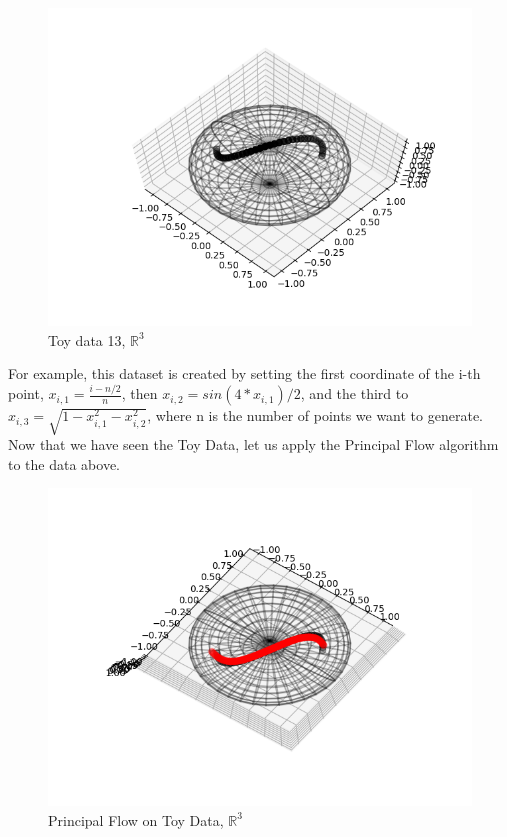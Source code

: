 \documentclass[12pt]{report}
\begin{document}
\begin{figure}[h]
    \begin{center}
        \includegraphics[]{Data_13.png}
        \caption{Toy data 13, $\mathbb{R}^3$}
        \label{fig:toydata}
    \end{center}
\end{figure}

\newpage

For example, this dataset is created by setting the first coordinate of the 
i-th point, $x_{i, 1} = \frac{i-n/2}{n}$, then $x_{i, 2} = sin(4*x_{i, 1})/2$, 
and the third to $x_{i, 3} = \sqrt{1-x_{i, 1}^2 - x_{i, 2}^2}$, 
where n is the number of points we want to generate.\\
Now that we have seen the Toy Data, let us apply the Principal Flow 
algorithm to the data above.

\begin{figure}[h]
    \begin{center}
        \includegraphics[]{single_flow_13.png}
        \caption{Principal Flow on Toy Data, $\mathbb{R}^3$}
        \label{fig:pflowtoy}
    \end{center}
\end{figure}
\end{document}
